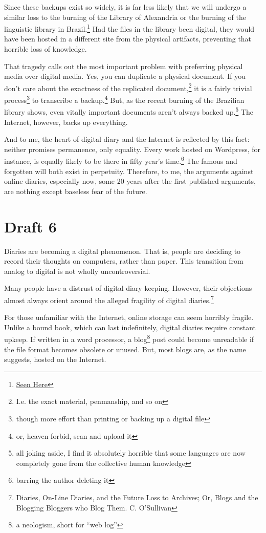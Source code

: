 \documentclass[12pt]{article}[titlepage]
\newcommand{\say}[1]{``#1''}
\newcommand{\1}{\={a}}
\newcommand{\2}{\={e}}
\newcommand{\3}{\={\i}}
\newcommand{\4}{\=o}
\newcommand{\5}{\=u}
\newcommand{\6}{\={A}}
\renewcommand{\,}{\textsuperscript{,}}
\begin{document}
Since these backups exist so widely, it is far less likely that we will undergo a similar loss to the burning of the Library of Alexandria or the burning of the linguistic library in Brazil.\footnote{\href{https://www.nationalgeographic.com/science/2018/09/news-museu-nacional-fire-rio-de-janeiro-natural-history/}{Seen Here}}
Had the files in the library been digital, they would have been hosted in a different site from the physical artifacts, preventing that horrible loss of knowledge.

That tragedy calls out the most important problem with preferring physical media over digital media.
Yes, you can duplicate a physical document.
If you don’t care about the exactness of the replicated document,\footnote{I.e. the exact material, penmanship, and so on} it is a fairly trivial process\footnote{though more effort than printing or backing up a digital file} to transcribe a backup.\footnote{or, heaven forbid, scan and upload it}
But, as the recent burning of the Brazilian library shows, even vitally important documents aren’t always backed up.\footnote{all joking aside, I find it absolutely horrible that some languages are now completely gone from the collective human knowledge}
The Internet, however, backs up everything.

And to me, the heart of digital diary and the Internet is reflected by this fact: neither promises permanence, only equality.
Every work hosted on Wordpress, for instance, is equally likely to be there in fifty year’s time.\footnote{barring the author deleting it}
The famous and forgotten will both exist in perpetuity.
Therefore, to me, the arguments against online diaries, especially now, some 20 years after the first published arguments, are nothing except baseless fear of the future.

\section{Draft 6}
Diaries are becoming a digital phenomenon.
That is, people are deciding to record their thoughts on computers, rather than paper.
This transition from analog to digital is not wholly uncontroversial.

Many people have a distrust of digital diary keeping.
However, their objections almost always orient around the alleged fragility of digital diaries.\footnote{Diaries, On-Line Diaries, and the Future Loss to Archives; Or, Blogs and the Blogging Bloggers who Blog Them. C. O’Sullivan}

For those unfamiliar with the Internet, online storage can seem horribly fragile.
Unlike a bound book, which can last indefinitely, digital diaries require constant upkeep.
If written in a word processor, a blog\footnote{a neologism, short for \say{web log}} post could become unreadable if the file format becomes obsolete or unused.
But, most blogs are, as the name suggests, hosted on the Internet.
\end{document}
